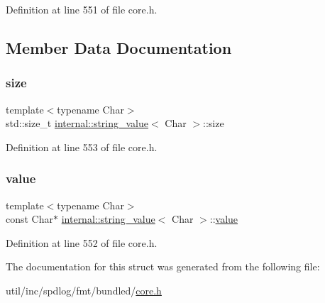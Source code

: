 Definition at line 551 of file core.\+h.



\subsection{Member Data Documentation}
\mbox{\label{structinternal_1_1string__value_a6f416973ea8f719f71d8ff9dbbdcac77}} 
\subsubsection{\texorpdfstring{size}{size}}
{\footnotesize\ttfamily template$<$typename Char$>$ \\
std\+::size\+\_\+t \hyperlink{structinternal_1_1string__value}{internal\+::string\+\_\+value}$<$ Char $>$\+::size}



Definition at line 553 of file core.\+h.

\mbox{\label{structinternal_1_1string__value_a1ec13adb65d19bbdd8f5168e059e8e6d}} 
\subsubsection{\texorpdfstring{value}{value}}
{\footnotesize\ttfamily template$<$typename Char$>$ \\
const Char$\ast$ \hyperlink{structinternal_1_1string__value}{internal\+::string\+\_\+value}$<$ Char $>$\+::\hyperlink{classinternal_1_1value}{value}}



Definition at line 552 of file core.\+h.



The documentation for this struct was generated from the following file\+:\begin{DoxyCompactItemize}
\item 
util/inc/spdlog/fmt/bundled/\hyperlink{core_8h}{core.\+h}\end{DoxyCompactItemize}
